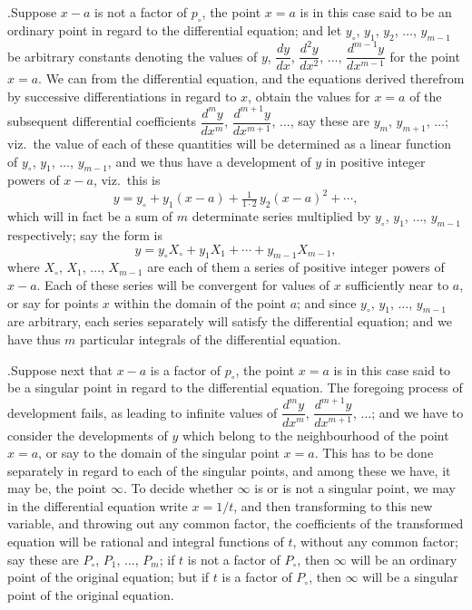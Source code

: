 \documentclass[11pt]{article}
\begin{document}
.\quad Suppose $x-a$ is not a factor of $p_{\circ}$, the point $x=a$ is in this case said to be an ordinary point in regard to the differential equation; and let $y_{\circ}$, $y_1$, $y_2$, $\dotsc$, $y_{m-1}$ be arbitrary constants denoting the values of $y$, $\dfrac{dy}{dx}$, $\dfrac{d^2y}{dx^2}$, $\dotsc$, $\dfrac{d^{m-1}y}{dx^{m-1}}$ for the point $x=a$. We can from the differential equation, and the equations derived therefrom by successive differentiations in regard to $x$, obtain the values for $x=a$ of the subsequent differential coefficients $\dfrac{d^m y}{dx^m}$, $\dfrac{d^{m+1}y}{dx^{m+1}}$, $\dotsc$, say these are $y_m$, $y_{m+1}$, $\dotsc$; viz.\ the value of each of these quantities will be determined as a linear function of $y_{\circ}$, $y_1$, $\dotsc$, $y_{m-1}$, and we thus have a development of $y$ in positive integer powers of $x-a$, viz.\ this is
\[
y = y_{\circ} + y_1(x-a) + \tfrac{1}{1\cdot 2}\,y_2(x-a)^2 + \dotsb,
\]
which will in fact be a sum of $m$ determinate series multiplied by $y_{\circ}$, $y_1$, $\dotsc$, $y_{m-1}$ respectively; say the form is
\[
y = y_{\circ}X_{\circ} + y_1X_1 + \dotsb + y_{m-1}X_{m-1},
\]
where $X_{\circ}$, $X_1$, $\dotsc$, $X_{m-1}$ are each of them a series of positive integer powers of $x-a$. Each of these series will be convergent for values of $x$ sufficiently near to $a$, or say for points $x$ within the domain of the point $a$; and since $y_{\circ}$, $y_1$, $\dotsc$, $y_{m-1}$ are arbitrary, each series separately will satisfy the differential equation; and we have thus $m$ particular integrals of the differential equation.

\medskip

.\quad Suppose next that $x-a$ is a factor of $p_{\circ}$, the point $x=a$ is in this case said to be a singular point in regard to the differential equation. The foregoing process of development fails, as leading to infinite values of $\dfrac{d^m y}{dx^m}$, $\dfrac{d^{m+1}y}{dx^{m+1}}$, $\dotsc$; and we have to consider the developments of $y$ which belong to the neighbourhood of the point $x=a$, or say to the domain of the singular point $x=a$. This has to be done separately in regard to each of the singular points, and among these we have, it may be, the point $\infty$. To decide whether $\infty$ is or is not a singular point, we may in the differential equation write $x = 1/t$, and then transforming to this new variable, and throwing out any common factor, the coefficients of the transformed equation will be rational and integral functions of $t$, without any common factor; say these are $P_{\circ}$, $P_1$, $\dotsc$, $P_m$; if $t$ is not a factor of $P_{\circ}$, then $\infty$ will be an ordinary point of the original equation; but if $t$ is a factor of $P_{\circ}$, then $\infty$ will be a singular point of the original equation.
\end{document}
